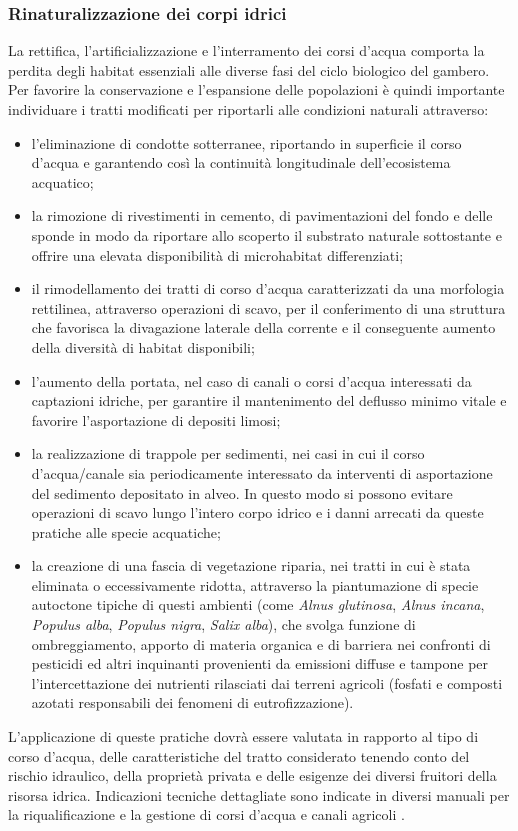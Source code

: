 \documentclass[11pt,a4paper,italian,twoside,openany]{memoir}
\begin{document}
\subsubsection{Rinaturalizzazione dei corpi idrici}
La rettifica, l'artificializzazione e l'interramento dei corsi d'acqua comporta la perdita degli habitat essenziali alle diverse fasi del ciclo biologico del gambero. Per favorire la conservazione e l'espansione delle popolazioni è quindi importante individuare i tratti modificati per riportarli alle condizioni naturali attraverso: 
\begin{itemize}
  \item l'eliminazione di condotte sotterranee, riportando in superficie il corso d'acqua e garantendo così la continuità longitudinale dell'ecosistema acquatico;
  \item la rimozione di rivestimenti in cemento, di pavimentazioni del fondo e delle sponde in modo da riportare allo scoperto il substrato naturale sottostante e offrire una elevata disponibilità di microhabitat differenziati;
  \item il rimodellamento dei tratti di corso d'acqua caratterizzati da una morfologia rettilinea, attraverso operazioni di scavo, per il conferimento di una struttura che favorisca la divagazione laterale della corrente e il conseguente aumento della diversità di habitat disponibili;
  \item l'aumento della portata, nel caso di canali o corsi d'acqua interessati da captazioni idriche, per garantire il mantenimento del deflusso minimo vitale e favorire l'asportazione di depositi limosi;
  \item la realizzazione di trappole per sedimenti, nei casi in cui il corso d'acqua/canale sia periodicamente interessato da interventi di asportazione del sedimento depositato in alveo. In questo modo si possono evitare operazioni di scavo lungo l'intero corpo idrico e i danni arrecati da queste pratiche alle specie acquatiche;
  \item la creazione di una fascia di vegetazione riparia, nei tratti in cui è stata eliminata o eccessivamente ridotta, attraverso la piantumazione di specie autoctone tipiche di questi ambienti (come \emph{Alnus glutinosa}, \emph{Alnus incana}, \emph{Populus alba}, \emph{Populus nigra}, \emph{Salix alba}), che svolga funzione di ombreggiamento, apporto di materia organica e di barriera nei confronti di pesticidi ed altri inquinanti provenienti da emissioni diffuse e tampone per l'intercettazione dei nutrienti rilasciati dai terreni agricoli (fosfati e composti azotati responsabili dei fenomeni di eutrofizzazione). 
\end{itemize}
L'applicazione di queste pratiche dovrà essere valutata in rapporto al tipo di corso d'acqua, delle caratteristiche del tratto considerato tenendo conto del rischio idraulico, della proprietà privata e delle esigenze dei diversi fruitori della risorsa idrica. Indicazioni tecniche dettagliate sono indicate in diversi manuali per la riqualificazione e la gestione di corsi d'acqua e canali agricoli \cite{CIRF 2006} \cite{Regione Emilia Romagna 2012} \cite{Veneto Agricoltura 2011}.
\end{document}
